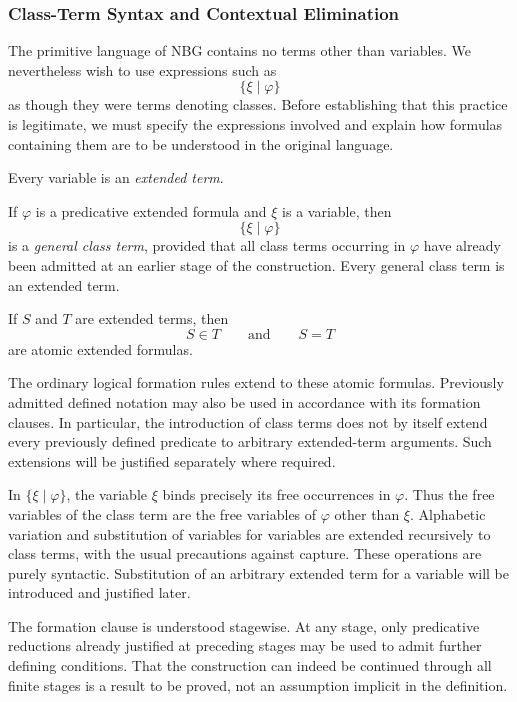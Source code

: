 
\subsubsection{Class-Term Syntax and Contextual Elimination}
\label{sec:class-term-syntax-and-elimination}


The primitive language of NBG contains no terms other than variables.
We nevertheless wish to use expressions such as
\[
\{\xi\mid\varphi\}
\]
as though they were terms denoting classes. Before establishing that
this practice is legitimate, we must specify the expressions involved
and explain how formulas containing them are to be understood in the
original language.

\begin{definition}
\label{def:general-class-terms}
Every variable is an \emph{extended term}.

If \(\varphi\) is a predicative extended formula and \(\xi\) is a
variable, then
\[
\{\xi\mid\varphi\}
\]
is a \emph{general class term}, provided that all class terms occurring
in \(\varphi\) have already been admitted at an earlier stage of the
construction. Every general class term is an extended term.

If \(S\) and \(T\) are extended terms, then
\[
S\in T
\qquad\text{and}\qquad
S=T
\]
are atomic extended formulas.
\end{definition}

The ordinary logical formation rules extend to these atomic formulas.
Previously admitted defined notation may also be used in accordance
with its formation clauses. In particular, the introduction of class
terms does not by itself extend every previously defined predicate to
arbitrary extended-term arguments. Such extensions will be justified
separately where required.

In \(\{\xi\mid\varphi\}\), the variable \(\xi\) binds precisely its
free occurrences in \(\varphi\). Thus the free variables of the class
term are the free variables of \(\varphi\) other than \(\xi\).
Alphabetic variation and substitution of variables for variables are
extended recursively to class terms, with the usual precautions against
capture. These operations are purely syntactic. Substitution of an
arbitrary extended term for a variable will be introduced and justified
later.

The formation clause is understood stagewise. At any stage, only
predicative reductions already justified at preceding stages may be
used to admit further defining conditions. That the construction can
indeed be continued through all finite stages is a result to be proved,
not an assumption implicit in the definition.

